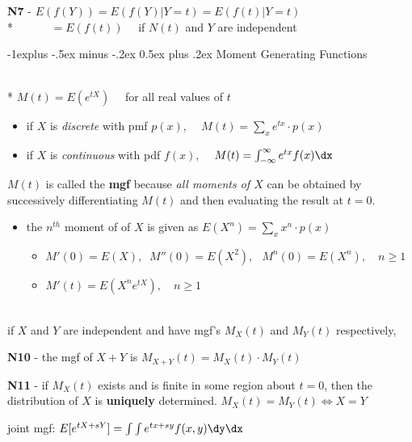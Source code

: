 \documentclass[10pt, landscape]{article}
\makeatletter
\renewcommand{\subsection}{\@startsection{subsection}{2}{0mm}%
  {-1explus -.5ex minus -.2ex}%
  {0.5ex plus .2ex}%
{\normalfont\normalsize\bfseries}}
\makeatother
\begin{document}
\begin{multicols*}{3}
    \textbf{N7} -  $E(f(Y)) = E(f(Y) \vert Y=t) = E(f(t) \vert Y=t)$
    \\*  $\quad\quad\quad = E(f(t)) \quad$ if $N(t)$ and $Y$ are independent

    \subsection{Moment Generating Functions}

    \begin{tightcenter}
      \\* $M(t) = E(e^{tX}) \quad$ for all real values of $t$
    \end{tightcenter}

    \begin{itemize}
      \item if $X$ is \textit{discrete} with pmf $p(x)$, $\quad M(t) = \sum_x e^{tx} \cdot p(x)$ 
      \item if $X$ is \textit{continuous} with pdf $f(x)$, $\quad M(t) = \int^\infty_{-\infty} e^{tx} f(x) \dx$
    \end{itemize}

    $M(t)$ is called the  \textbf{mgf} because \textit{all moments of $X$} can be obtained by successively differentiating $M(t)$ and then evaluating the result at $t=0$.

    \begin{itemize}
      \item the $n^{th}$ moment of of $X$ is given as $E(X^n) = \sum_x x^n\cdot p(x)$
        \begin{itemize}
          \item $M'(0) = E(X), \;\; M''(0) = E(X^2)$, $\;\; M^n(0) = E(X^n), \quad n \geq 1$
          \item $M'(t) = E(X^n e^{tX}), \quad n \geq 1$ 
        \end{itemize}
    \end{itemize}
    \ 
    \\ if $X$ and $Y$ are independent and have mgf's $M_X(t)$ and $M_Y(t)$ respectively, 

    \textbf{N10} - the mgf of $X+Y$ is $M_{X+Y}(t) = M_X(t) \cdot M_Y(t)$

    \textbf{N11} - if $M_X(t)$ exists and is finite in some region about $t=0$, then the distribution of $X$ is \textbf{uniquely} determined.
    $M_X(t) = M_Y(t) \iff X=Y$

    \begin{tightcenter}
      joint mgf:  $ E[e^{tX+sY}] = \int\int e^{tx+sy} f(x, y) \dy \dx $
    \end{tightcenter}


\end{multicols*}
\end{document}

